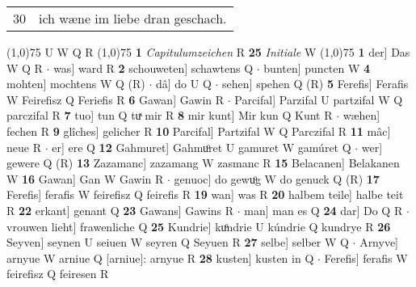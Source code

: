 \documentclass[8pt,a4paper,notitlepage]{article}
\begin{document}
\begin{table}[ht]
\begin{minipage}[t]{0.5\linewidth}
\begin{tabular}{rl}
30 & ich wæne im liebe dran geschach.\\ 
\end{tabular}
\scriptsize
\line(1,0){75} \newline
U W Q R \newline
\line(1,0){75} \newline
\textbf{1} \textit{Capitulumzeichen} R  \textbf{25} \textit{Initiale} W  \newline
\line(1,0){75} \newline
\textbf{1} der] Das W Q R  $\cdot$ was] ward R \textbf{2} schouweten] schawtens Q  $\cdot$ bunten] puncten W \textbf{4} mohten] mochtens W Q (R)  $\cdot$ dâ] do U Q  $\cdot$ sehen] spehen Q (R) \textbf{5} Ferefis] Ferafis W Feirefisz Q Feriefis R \textbf{6} Gawan] Gawin R  $\cdot$ Parcifal] Parzifal U partzifal W Q parczifal R \textbf{7} tuo] tun Q tuͯ mir R \textbf{8} mir kunt] Mir kun Q Kunt R  $\cdot$ wæhen] fechen R \textbf{9} glîches] gelicher R \textbf{10} Parcifal] Partzifal W Q Parczifal R \textbf{11} mâc] neue R  $\cdot$ er] ere Q \textbf{12} Gahmuret] Gahmuͦret U gamuret W gamúret Q  $\cdot$ wer] gewere Q (R) \textbf{13} Zazamanc] zazamang W zasmanc R \textbf{15} Belacanen] Belakanen W \textbf{16} Gawan] Gan W Gawin R  $\cdot$ genuoc] do gewuͦg W do genuck Q (R) \textbf{17} Ferefis] ferafis W feirefisz Q feirefis R \textbf{19} wan] was R \textbf{20} halbem teile] halbe teit R \textbf{22} erkant] genant Q \textbf{23} Gawans] Gawins R  $\cdot$ man] man es Q \textbf{24} dar] Do Q R  $\cdot$ vrouwen lieht] frawenliche Q \textbf{25} Kundrie] kuͦndrie U kúndrie Q kundrye R \textbf{26} Seyven] seynen U seiuen W seyren Q Seyuen R \textbf{27} selbe] selber W Q  $\cdot$ Arnyve] arnyue W arniue Q [arniue]: arnyue R \textbf{28} kusten] kusten in Q  $\cdot$ Ferefis] ferafis W feirefisz Q feiresen R \newline
\end{minipage}
\end{table}
\end{document}
